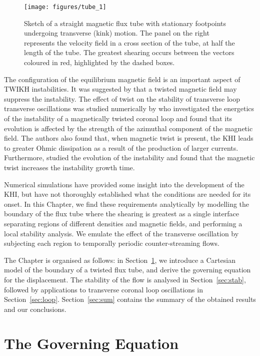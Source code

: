 \begin{figure*}[t]
\centering
\texttt{[image: figures/tube\_1]}
\caption{Sketch of a straight magnetic flux tube with stationary footpoints undergoing transverse (kink) motion. The panel on the right represents the velocity field in a cross section of the tube, at half the length of the tube. The greatest shearing occurs between the vectors coloured in red, highlighted by the dashed boxes.}
\label{fig:tube1}
\end{figure*}

The configuration of the equilibrium magnetic field is an important aspect of TWIKH instabilities.
It was suggested by \cite{Terradas2008} that a twisted magnetic field may suppress the instability.
The effect of twist on the stability of transverse loop transverse oscillations was studied numerically by \cite{Howson2017b} who investigated the energetics of the instability of a magnetically twisted coronal loop and found that its evolution is affected by the strength of the azimuthal component of the magnetic field.
The authors also found that, when magnetic twist is present, the KHI leads to greater Ohmic dissipation as a result of the production of larger currents.
Furthermore, \cite{Terradas2018} studied the evolution of the instability and found that the  magnetic twist increases the instability growth time.

Numerical simulations have provided some insight into the development of the KHI, but have not thoroughly established what the conditions are needed for its onset.
In this Chapter, we find these requirements analytically by modelling the boundary of the flux tube where the shearing is greatest as a single interface separating regions of different densities and magnetic fields, and performing a local stability analysis.
We emulate the effect of the transverse oscillation by subjecting each region to temporally periodic counter-streaming flows.

The Chapter is organised as follows: in Section~\ref{sec:goveq}, we introduce a Cartesian model of the boundary of a twisted flux tube, and derive the governing equation for the displacement.
The stability of the flow is analysed in Section~\ref{sec:stab}, followed by applications to transverse coronal loop oscillations in Section~\ref{sec:loop}.
Section~\ref{sec:sum} contains the summary of the obtained results and our conclusions.

\section{The Governing Equation}
\label{sec:goveq}

